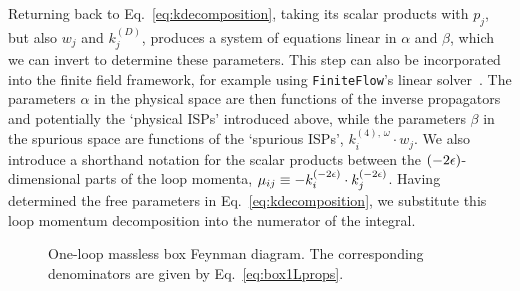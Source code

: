 \documentclass[main.tex]{subfiles}
\begin{document}
Returning back to Eq.~\ref{eq:kdecomposition}, taking its scalar products with $p_j$, but also $w_j$ and $k_j^{(D)}$, produces a system of equations linear in $\alpha$ and $\beta$, which we can invert to determine these parameters. This step can also be incorporated into the finite field framework, for example using \texttt{FiniteFlow}'s linear solver~\cite{Peraro:2019svx}. The parameters $\alpha$ in the physical space are then functions of the inverse propagators and potentially the `physical ISPs' introduced above, while the parameters $\beta$ in the spurious space are functions of the `spurious ISPs', $k_i^{(4),\, \omega} \cdot w_j$. We also introduce a shorthand notation for the scalar products between the $(-2\epsilon)$-dimensional parts of the loop momenta, $\mu_{ij} \equiv -k_i^{(-2\epsilon)} \cdot k_j^{(-2\epsilon)}$. Having determined the free parameters in Eq.~\ref{eq:kdecomposition}, we substitute this loop momentum decomposition into the numerator of the integral. 
\begin{figure}
    \centering
    \caption{One-loop massless box Feynman diagram. The corresponding denominators are given by Eq.~\ref{eq:box1Lprops}.} \label{fig:1Lboxnodot}
\end{figure}
\end{document}
